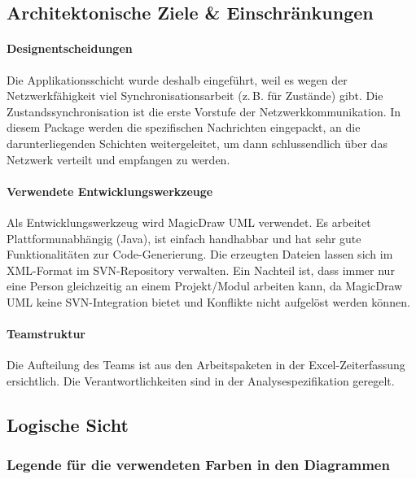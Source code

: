 \documentclass[a4paper,12pt,halfparskip,DIV12]{scrartcl}
\begin{document}
\subsection{Architektonische Ziele \& Einschränkungen} %
\label{sub:architektonische_ziele_einschraenkungen}
\paragraph{Designentscheidungen}\label{ssub:designentscheidungen} %
Die Applikationsschicht wurde deshalb eingeführt, weil es wegen der Netzwerkfähigkeit viel Synchronisationsarbeit (z.\,B. für Zustände) gibt. Die Zustandssynchronisation ist die erste Vorstufe der Netzwerkkommunikation. In diesem Package werden die spezifischen Nachrichten eingepackt, an die darunterliegenden Schichten weitergeleitet, um dann schlussendlich über das Netzwerk verteilt und empfangen zu werden.
\paragraph{Verwendete Entwicklungswerkzeuge}\label{ssub:verwendete_entwicklungswerkzeuge} %
Als Entwicklungswerkzeug wird MagicDraw UML verwendet. Es arbeitet Plattformunabhängig (Java), ist einfach handhabbar und hat sehr gute Funktionalitäten zur Code-Generierung. Die erzeugten Dateien lassen sich im XML-Format im SVN-Repository verwalten. Ein Nachteil ist, dass immer nur eine Person gleichzeitig an einem Projekt/Modul arbeiten kann, da MagicDraw UML keine SVN-Integration bietet und Konflikte nicht aufgelöst werden können.
\paragraph{Teamstruktur}\label{ssub:teamstruktur} %
Die Aufteilung des Teams ist aus den Arbeitspaketen in der Excel-Zeiterfassung ersichtlich. Die Verantwortlichkeiten sind in der Analysespezifikation geregelt.

\subsection{Logische Sicht} %
\label{sub:logische_schicht}

\subsubsection{Legende für die verwendeten Farben in den Diagrammen} %
\label{ssub:legende_fuer_die_verwendeten_farben_in_den_diagrammen}
\end{document}
